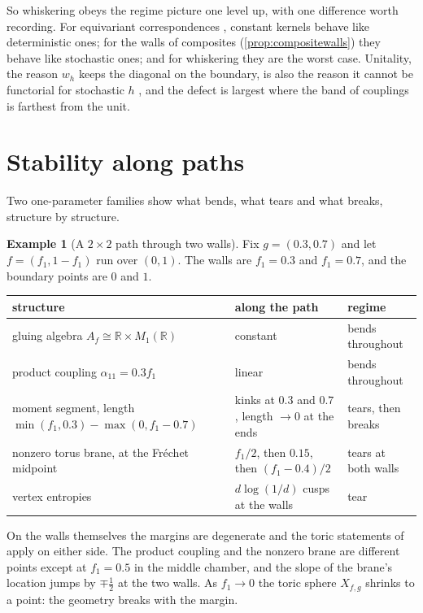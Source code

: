 \documentclass[11pt]{article}
\theoremstyle{definition}
\newtheorem{example}[theorem]{Example}
\theoremstyle{remark}
\newcommand{\R}{\mathbb{R}}
\begin{document}
So whiskering obeys the regime picture one level up, with one difference worth recording. For equivariant correspondences \cite[Thm.~6.1]{Bridges}, constant
kernels behave like deterministic ones; for the walls of composites (\cref{prop:compositewalls}) they behave like stochastic ones; and for
whiskering they are the worst case. Unitality, the reason $w_h$ keeps the diagonal on the boundary, is also the
reason it cannot be functorial for stochastic $h$ \cite[Thm.~10.2]{Conditionals}, and the defect is largest where the band of couplings is
farthest from the unit.

\section{Stability along paths}\label{sec:paths}

Two one-parameter families show what bends, what tears and what breaks, structure by structure.

\begin{example}[A $2\times2$ path through two walls]\label{ex:path22}
Fix $g=(0.3,0.7)$ and let $f=(f_1,1-f_1)$ run over $(0,1)$. The walls are $f_1=0.3$ and $f_1=0.7$, and the boundary points are $0$ and $1$.
\begin{center}
\begin{tabular}{p{5.4cm}p{5.6cm}p{3.2cm}}
\toprule
structure & along the path & regime\\
\midrule
gluing algebra $A_f\cong\R\times M_1(\R)$ & constant & bends throughout\\
product coupling $\alpha_{11}=0.3f_1$ & linear & bends throughout\\
moment segment, length $\min(f_1,0.3)-\max(0,f_1-0.7)$ & kinks at $0.3$ and $0.7$, length $\to0$ at the ends & tears, then breaks\\
nonzero torus brane, at the Fréchet midpoint & $f_1/2$, then $0.15$, then $(f_1-0.4)/2$ & tears at both walls\\
vertex entropies & $d\log(1/d)$ cusps at the walls & tear\\
\bottomrule
\end{tabular}
\end{center}
On the walls themselves the margins are degenerate and the toric statements of \cite{Bridges} apply on either side. The product
coupling and the nonzero brane are different points except at $f_1=0.5$ in the middle chamber, and the slope of the brane's
location jumps by $\mp\frac12$ at the two walls. As $f_1\to0$ the toric sphere $X_{f,g}$ shrinks to a point: the geometry breaks with the
margin.
\end{example}
\end{document}
